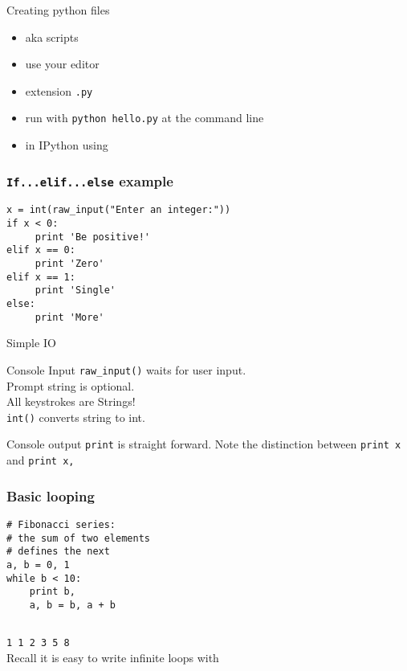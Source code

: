 \documentclass[14pt,compress]{beamer}
\newcounter{time}
\newcommand{\inctime}[1]{\addtocounter{time}{#1}{\tiny \thetime\ m}}
\newcommand{\typ}[1]{\texttt{#1}}
\newcommand{\kwrd}[1]{ \texttt{\textbf{\color{blue}{#1}}}  }
\begin{document}
\begin{frame}
  {Creating python files}
  \begin{itemize}
    \item aka scripts
    \item use your editor
    \item extension \typ{.py}
    \item run with \texttt{python hello.py} at the command line
    \item in IPython using \kwrd{\%run}
  \end{itemize}
\end{frame}

\begin{frame}[fragile]
  \frametitle{\typ{If...elif...else} example}
\begin{lstlisting}
x = int(raw_input("Enter an integer:"))
if x < 0:
     print 'Be positive!'
elif x == 0:
     print 'Zero'
elif x == 1:
     print 'Single'
else:
     print 'More'
\end{lstlisting}
\end{frame}

\begin{frame}{Simple IO}
  \begin{block}
    {Console Input}
    \texttt{raw\_input()} waits for user input.\\Prompt string is optional.\\
    All keystrokes are Strings!\\\texttt{int()} converts string to int.
  \end{block}
  \begin{block}
    {Console output}
    \texttt{print} is straight forward. Note the distinction between \texttt{print x} and \texttt{print x,}
  \end{block}
\end{frame}

\begin{frame}[fragile]
  \frametitle{Basic looping}
  \begin{lstlisting}
# Fibonacci series:
# the sum of two elements
# defines the next
a, b = 0, 1
while b < 10:
    print b,
    a, b = b, a + b
 
\end{lstlisting}
\typ{1 1 2 3 5 8}\\  
\alert{Recall it is easy to write infinite loops with \kwrd{while}}
  \inctime{20}
\end{frame}

\end{document}
